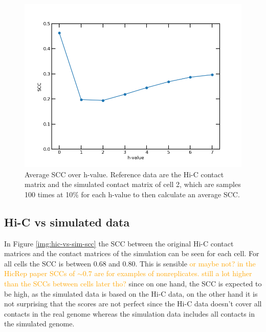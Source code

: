\documentclass[10pt,abstract=true,titlepage=false,toc=bib]{scrartcl}
\begin{document}
\begin{figure}[ht]
\centering
	\includegraphics[width=14cm]{h_train.png}
	\caption{Average SCC over h-value. Reference data are the Hi-C contact matrix and the simulated contact matrix of cell 2, which are samples 100 times at 10\% for each h-value to then calculate an average SCC.}
	\label{img:h_train}
\end{figure}


\subsection{Hi-C vs simulated data} %
\label{sub:hi_c_vs_simulated_data}

In Figure \ref{img:hic-vs-sim-scc} the SCC between the original Hi-C contact matrices and the contact matrices of the simulation can be seen for each cell. For all cells the SCC is between \(0.68\) and \(0.80\). This is sensible \textcolor{orange}{or maybe not? in the HicRep paper SCCs of \(\sim 0.7\) are for examples of nonreplicates. still a lot higher than the SCCs between cells later tho?} since on one hand, the SCC is expected to be high, as the simulated data is based on the Hi-C data, on the other hand it is not surprising that the scores are not perfect since the Hi-C data doesn't cover all contacts in the real genome whereas the simulation data includes all contacts in the simulated genome.
\end{document}
